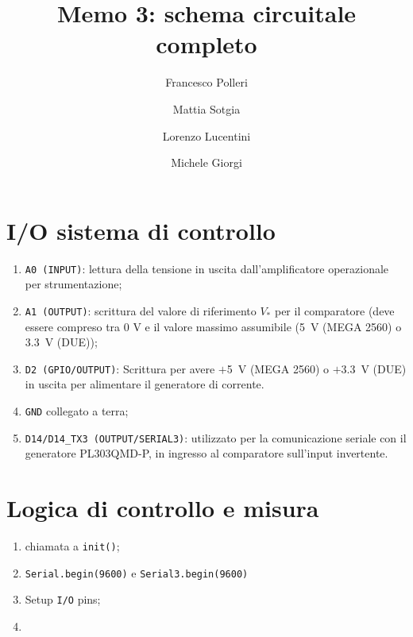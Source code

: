 \documentclass[fleqn,varvw,preprintnumbers,citeautoscript]{memo}
\begin{document}
\title{Memo 3: schema circuitale completo}

\author{Francesco Polleri}
\author{Mattia Sotgia}


\author{Lorenzo Lucentini}
\author{Michele Giorgi}

\revised{\today}

\begin{abstract}

\end{abstract}
\maketitle

\section{I/O sistema di controllo}

\begin{enumerate}
    \item \verb-A0 (INPUT)-: lettura della tensione in uscita dall'amplificatore operazionale per strumentazione;
    \item \verb-A1 (OUTPUT)-: scrittura del valore di riferimento $V_*$ per il comparatore (deve essere compreso tra 0 V e il valore massimo assumibile (\SI{5}{\volt} (MEGA 2560) o \SI{3.3}{\volt} (DUE));
    \item \verb-D2 (GPIO/OUTPUT)-: Scrittura per avere $+$\SI{5}{\volt} (MEGA 2560) o $+$\SI{3.3}{\volt} (DUE) in uscita per alimentare il generatore di corrente.
    \item \verb-GND- collegato a terra;
    \item \verb-D14/D14_TX3 (OUTPUT/SERIAL3)-: utilizzato per la comunicazione seriale con il generatore PL303QMD-P, in ingresso al comparatore sull'input invertente. 
\end{enumerate}

\section{Logica di controllo e misura}

\begin{enumerate}
    \item chiamata a \verb-init()-;
    \item \verb-Serial.begin(9600)- e \verb-Serial3.begin(9600)-
    \item Setup \verb-I/O- pins;
    \item 
\end{enumerate}
\end{document}
